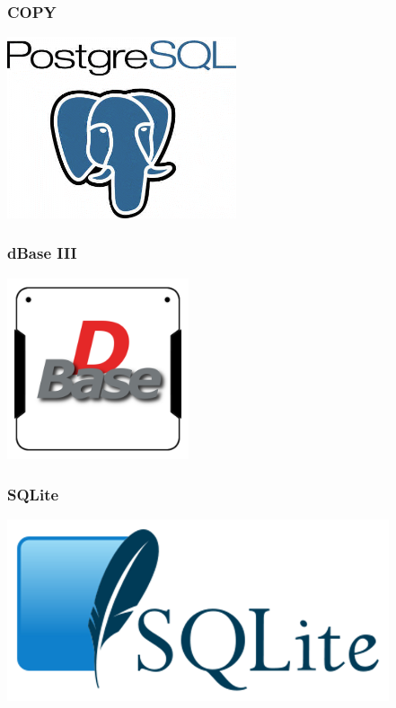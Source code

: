 \documentclass{beamer}
\begin{document}
\begin{frame}
  \frametitle{COPY}


  \begin{center}
    \includegraphics[height=2.1in]{postgres-logo.png}
  \end{center}
\end{frame}

\begin{frame}
  \frametitle{dBase III}


  \begin{center}
    \includegraphics[height=2.1in]{dBase.png}
  \end{center}
\end{frame}

\begin{frame}
  \frametitle{SQLite}


  \begin{center}
    \includegraphics[height=2.1in]{SQLite.png}
  \end{center}
\end{frame}
\end{document}
